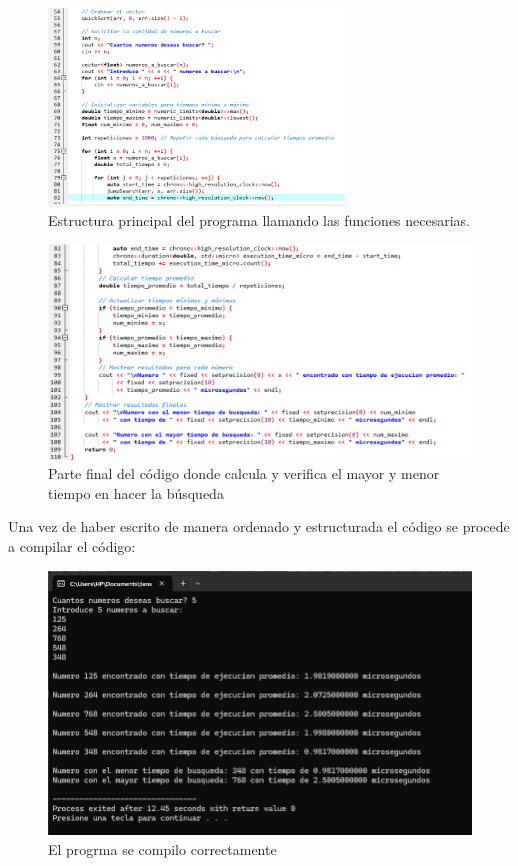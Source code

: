 \documentclass[12pt]{article}
\begin{document}
\begin{figure}[t]
    \centering
    \includegraphics[width=0.7\textwidth]{imagen3.png}
    \caption{Estructura principal del programa llamando las funciones necesarias.}
    \label{fig:estructura-principal}
\end{figure}
\begin{figure}
    \centering
    \includegraphics[width=0.7\linewidth]{imagen4.png}
    \caption{Parte final del código donde calcula y verifica el mayor y menor tiempo en hacer la búsqueda}
    \label{fig:enter-label}
\end{figure} 
\clearpage 
Una vez de haber escrito de manera ordenado y estructurada el código se procede a compilar el código:
\begin{figure}
    \centering
    \includegraphics[width=0.7\linewidth]{imagen5.png}
    \caption{El progrma se compilo correctamente}
    \label{fig:enter-label}
\end{figure}
\end{document}

